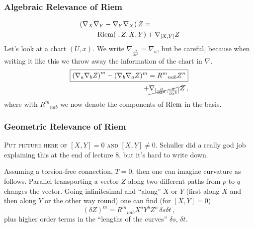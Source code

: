 \documentclass[11pt, a4paper, twocolumn]{article} %
\begin{document}
\subsubsection{Algebraic Relevance of Riem}
\begin{align}
    \nonumber &\left( \nabla_X \nabla_Y - \nabla_Y \nabla_X \right)Z =\\ %
    &\phantom{blabla}\Riem(\cdot, Z,X,Y) + \nabla_{[X,Y]}Z
\end{align}
Let's look at a chart $(U,x)$.
We write $\nabla_{\frac{\partial}{\partial x^a}} = \nabla_a$, but be careful, because when
writing it like this we throw away the information of the chart in $\nabla$.
\begin{align}
    \boxed{\left( \nabla_a\nabla_b Z \right)^m - (\nabla_b\nabla_a Z)^m = R^m{}_{nab}Z^n
    }
    \\\nonumber+ \cancel{\nabla_{[\frac{\partial}{\partial x^a},\frac{\partial}{\partial x^b}]}Z}\,,
\end{align}
where with $R^{m}{}_{nab}$ we now denote the components of $\operatorname{Riem}$ in the basis.

\subsubsection{Geometric Relevance of Riem}
\begin{center}
    \textsc{Put picture here of $[X,Y] = 0$ and
    $[X,Y] \neq 0$}.
    Schuller did a really god job explaining this at the end of lecture
    8, but it's hard to write down.
\end{center}

Assuming a torsion-free connection, $T=0$, then one can imagine curvature as follows.
Parallel transporting a vector $Z$ along two different paths from $p$ to $q$
changes the vector.
Going infinitesimal and ``along'' $X$ or $Y$ (first along $X$ and then along $Y$ or the other
way round) one can find (for $[X,Y] = 0$)
\begin{equation}
    (\delta Z)^m = R^m{}_{nab}X^aY^bZ^n\,\delta s\delta t\,,
\end{equation}
plus higher order terms in the ``lengths of the curves'' $\delta s$, $\delta t$.
\end{document}
